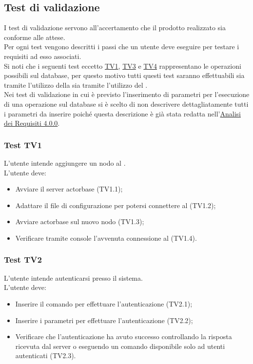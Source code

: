 \documentclass{scalatekids-article}
\begin{document}
\subsection{Test di validazione}

I test di validazione servono all'accertamento che il prodotto realizzato sia conforme
alle attese.\\
Per ogni test vengono descritti i passi che un utente deve eseguire per testare i
requisiti ad esso associati.\\
Si noti che i seguenti test eccetto \hyperref[sec:TV1]{TV1}, \hyperref[sec:TV3]{TV3} e \hyperref[sec:TV4]{TV4} rappresentano le operazioni possibili
sul database, per questo motivo tutti questi test saranno effettuabili sia
tramite l'utilizzo della  sia tramite l'utilizzo del .\\
Nei test di validazione in cui è previsto l'inserimento di parametri per
l'esecuzione di una operazione sul database si è scelto di non descrivere
dettagliatamente tutti i parametri da inserire poiché questa descrizione è
già stata redatta nell'\href{run:../Esterni/AnalisiDeiRequisiti\_v4.0.0.pdf}{Analisi dei Requisiti 4.0.0}.\\

\subsubsection{Test TV1}
\label{sec:TV1}

L'utente intende aggiungere un nodo al .\\
L'utente deve:
\begin{itemize}
\item Avviare il server actorbase (TV1.1);
\item Adattare il file di configurazione per potersi connettere al  (TV1.2);
\item Avviare actorbase sul nuovo nodo (TV1.3);
\item Verificare tramite console l'avvenuta connessione al  (TV1.4).
\end{itemize}

\subsubsection{Test TV2}

L'utente intende autenticarsi presso il sistema.\\
L'utente deve:
\begin{itemize}
\item Inserire il comando per effettuare l'autenticazione (TV2.1);
\item Inserire i parametri per effettuare l'autenticazione (TV2.2);
\item Verificare che l'autenticazione ha avuto successo controllando la
  risposta ricevuta dal server o eseguendo un comando
  disponibile solo ad utenti autenticati (TV2.3).
\end{itemize}
\end{document}
